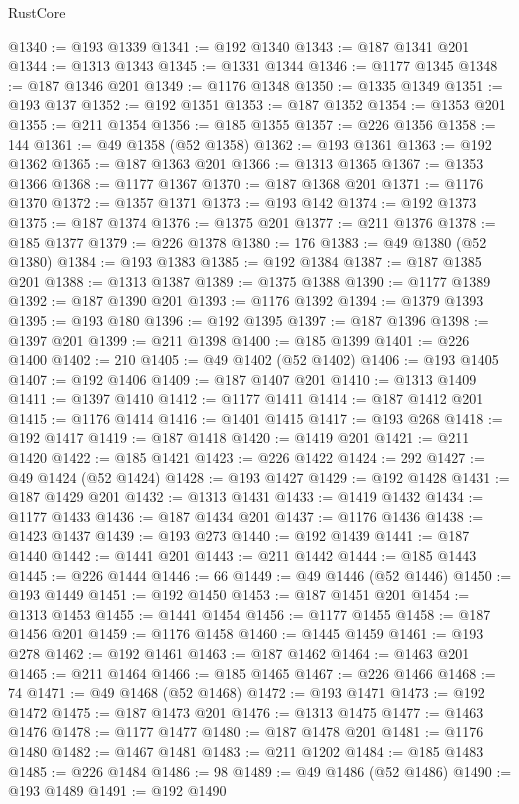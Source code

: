 \begin{lexlean}{RustCore}
\begin{coremodule}
@1340 := @193 @1339
@1341 := @192 @1340
@1343 := @187 @1341 @201
@1344 := @1313 @1343
@1345 := @1331 @1344
@1346 := @1177 @1345
@1348 := @187 @1346 @201
@1349 := @1176 @1348
@1350 := @1335 @1349
@1351 := @193 @137
@1352 := @192 @1351
@1353 := @187 @1352
@1354 := @1353 @201
@1355 := @211 @1354
@1356 := @185 @1355
@1357 := @226 @1356
@1358 := 144
@1361 := @49 @1358 (@52 @1358)
@1362 := @193 @1361
@1363 := @192 @1362
@1365 := @187 @1363 @201
@1366 := @1313 @1365
@1367 := @1353 @1366
@1368 := @1177 @1367
@1370 := @187 @1368 @201
@1371 := @1176 @1370
@1372 := @1357 @1371
@1373 := @193 @142
@1374 := @192 @1373
@1375 := @187 @1374
@1376 := @1375 @201
@1377 := @211 @1376
@1378 := @185 @1377
@1379 := @226 @1378
@1380 := 176
@1383 := @49 @1380 (@52 @1380)
@1384 := @193 @1383
@1385 := @192 @1384
@1387 := @187 @1385 @201
@1388 := @1313 @1387
@1389 := @1375 @1388
@1390 := @1177 @1389
@1392 := @187 @1390 @201
@1393 := @1176 @1392
@1394 := @1379 @1393
@1395 := @193 @180
@1396 := @192 @1395
@1397 := @187 @1396
@1398 := @1397 @201
@1399 := @211 @1398
@1400 := @185 @1399
@1401 := @226 @1400
@1402 := 210
@1405 := @49 @1402 (@52 @1402)
@1406 := @193 @1405
@1407 := @192 @1406
@1409 := @187 @1407 @201
@1410 := @1313 @1409
@1411 := @1397 @1410
@1412 := @1177 @1411
@1414 := @187 @1412 @201
@1415 := @1176 @1414
@1416 := @1401 @1415
@1417 := @193 @268
@1418 := @192 @1417
@1419 := @187 @1418
@1420 := @1419 @201
@1421 := @211 @1420
@1422 := @185 @1421
@1423 := @226 @1422
@1424 := 292
@1427 := @49 @1424 (@52 @1424)
@1428 := @193 @1427
@1429 := @192 @1428
@1431 := @187 @1429 @201
@1432 := @1313 @1431
@1433 := @1419 @1432
@1434 := @1177 @1433
@1436 := @187 @1434 @201
@1437 := @1176 @1436
@1438 := @1423 @1437
@1439 := @193 @273
@1440 := @192 @1439
@1441 := @187 @1440
@1442 := @1441 @201
@1443 := @211 @1442
@1444 := @185 @1443
@1445 := @226 @1444
@1446 := 66
@1449 := @49 @1446 (@52 @1446)
@1450 := @193 @1449
@1451 := @192 @1450
@1453 := @187 @1451 @201
@1454 := @1313 @1453
@1455 := @1441 @1454
@1456 := @1177 @1455
@1458 := @187 @1456 @201
@1459 := @1176 @1458
@1460 := @1445 @1459
@1461 := @193 @278
@1462 := @192 @1461
@1463 := @187 @1462
@1464 := @1463 @201
@1465 := @211 @1464
@1466 := @185 @1465
@1467 := @226 @1466
@1468 := 74
@1471 := @49 @1468 (@52 @1468)
@1472 := @193 @1471
@1473 := @192 @1472
@1475 := @187 @1473 @201
@1476 := @1313 @1475
@1477 := @1463 @1476
@1478 := @1177 @1477
@1480 := @187 @1478 @201
@1481 := @1176 @1480
@1482 := @1467 @1481
@1483 := @211 @1202
@1484 := @185 @1483
@1485 := @226 @1484
@1486 := 98
@1489 := @49 @1486 (@52 @1486)
@1490 := @193 @1489
@1491 := @192 @1490

\end{coremodule}
\end{lexlean}
